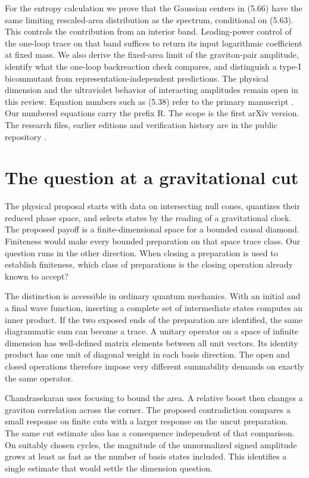 \documentclass[11pt]{article}
\begin{document}
For the entropy calculation we prove that the Gaussian centers in (5.66) have the same limiting rescaled-area distribution as the spectrum, conditional on (5.63). This controls the contribution from an interior band. Leading-power control of the one-loop trace on that band suffices to return its input logarithmic coefficient at fixed mass. We also derive the fixed-area limit of the graviton-pair amplitude, identify what the one-loop backreaction check compares, and distinguish a type-I bicommutant from representation-independent predictions. The physical dimension and the ultraviolet behavior of interacting amplitudes remain open in this review.
\clearpage
\thispagestyle{plain}\tableofcontents
\vfill\noindent\small Equation numbers such as (5.38) refer to the primary manuscript \cite{VC}. Our numbered equations carry the prefix R. The scope is the first arXiv version. The research files, earlier editions and verification history are in the public repository \cite{repo}.\normalsize
\clearpage{}
\renewcommand{\theequation}{R\arabic{equation}}

\section{The question at a gravitational cut}
The physical proposal starts with data on intersecting null cones, quantizes their reduced phase space, and selects states by the reading of a gravitational clock. The proposed payoff is a finite-dimensional space for a bounded causal diamond. Finiteness would make every bounded preparation on that space trace class. Our question runs in the other direction. When closing a preparation is used to establish finiteness, which class of preparations is the closing operation already known to accept?

The distinction is accessible in ordinary quantum mechanics. With an initial and a final wave function, inserting a complete set of intermediate states computes an inner product. If the two exposed ends of the preparation are identified, the same diagrammatic sum can become a trace. A unitary operator on a space of infinite dimension has well-defined matrix elements between all unit vectors. Its identity product has one unit of diagonal weight in each basis direction. The open and closed operations therefore impose very different summability demands on exactly the same operator.

Chandrasekaran uses focusing to bound the area. A relative boost then changes a graviton correlation across the corner. The proposed contradiction compares a small response on finite cuts with a larger response on the uncut preparation. The same cut estimate also has a consequence independent of that comparison. On suitably chosen cycles, the magnitude of the unnormalized signed amplitude grows at least as fast as the number of basis states included. This identifies a single estimate that would settle the dimension question.
\end{document}
